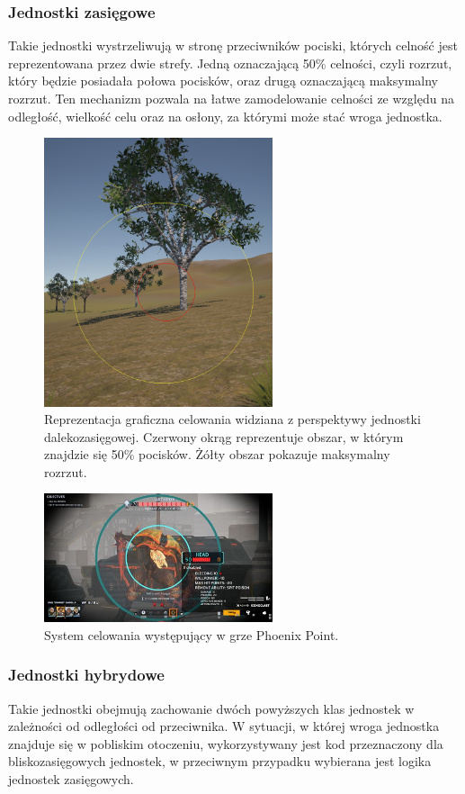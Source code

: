 \subsubsection{Jednostki zasięgowe}
Takie jednostki wystrzeliwują w stronę przeciwników pociski, których celność jest reprezentowana przez dwie strefy. Jedną oznaczającą 50\% celności,
czyli rozrzut, który będzie posiadała połowa pocisków, oraz drugą oznaczającą maksymalny rozrzut. Ten mechanizm pozwala na łatwe zamodelowanie
celności ze względu na odległość, wielkość celu oraz na osłony, za którymi może stać wroga jednostka.
\begin{figure}[h]
\centering
\includegraphics[width=0.6\textwidth]{images/acc}
\caption{Reprezentacja graficzna celowania widziana z perspektywy jednostki dalekozasięgowej. Czerwony okrąg reprezentuje obszar, w którym znajdzie się 50\% pocisków. Żółty obszar pokazuje maksymalny rozrzut.}
\label{fig:acc2}
\end{figure}
\begin{figure}[h]
\centering
\includegraphics[width=0.6\textwidth]{images/point}
\caption{System celowania występujący w grze Phoenix Point.}
\label{fig:acc}
\end{figure}
\subsubsection{Jednostki hybrydowe}
Takie jednostki obejmują zachowanie dwóch powyższych klas jednostek w zależności od odległości od przeciwnika.
W sytuacji, w której wroga jednostka znajduje się w pobliskim otoczeniu, wykorzystywany jest kod przeznaczony dla bliskozasięgowych jednostek,
w przeciwnym przypadku wybierana jest logika jednostek zasięgowych.
